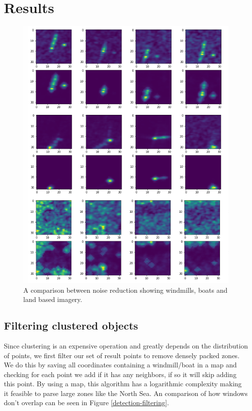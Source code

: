 \section{Results}
%

\begin{figure}[ht]
\begin{center}
\centerline{\includegraphics[width=\columnwidth]{images/denoise-final.png}}
\caption{A comparison between noise reduction showing windmills, boats and land based imagery.}
\label{noise-reduction-results}
\end{center}
\end{figure}

\subsection{Filtering clustered objects}

Since clustering is an expensive operation and greatly depends on the distribution of points, we first filter our set of result points to remove densely packed zones. We do this by saving all coordinates containing a windmill/boat in a map and checking for each point we add if it has any neighbors, if so it will skip adding this point. By using a map, this algorithm has a logarithmic complexity making it feasible to parse large zones like the North Sea. An comparison of how windows don't overlap can be seen in Figure \ref{detection-filtering}.

